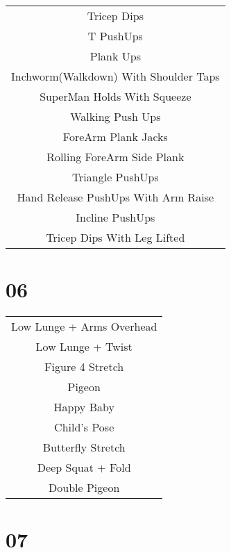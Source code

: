 \documentclass[12pt]{article}
\newcommand\myPadding{1.5}
\begin{document}
\begin{center}
  \bgroup
  \def\arraystretch{\myPadding}%
  \begin{tabular}{ c  }
Tricep Dips
\\
T PushUps
\\
Plank Ups
\\
Inchworm(Walkdown) With Shoulder Taps
\\
SuperMan Holds With Squeeze
\\
Walking Push Ups
\\
ForeArm Plank Jacks
\\
Rolling ForeArm Side Plank
\\
Triangle PushUps
\\
Hand Release PushUps With Arm Raise
\\
Incline PushUps
\\
Tricep Dips With Leg Lifted
  \end{tabular}
  \egroup
\end{center}






\section{06}


\begin{center}
  \bgroup
  \def\arraystretch{\myPadding}%
  \begin{tabular}{ c  }
Low Lunge + Arms Overhead
\\
Low Lunge + Twist
\\
Figure 4 Stretch
\\
Pigeon
\\
Happy Baby
\\
Child's Pose
\\
Butterfly Stretch
\\
Deep Squat + Fold
\\
Double Pigeon
  \end{tabular}
  \egroup
\end{center}




\section{07}
\end{document}
